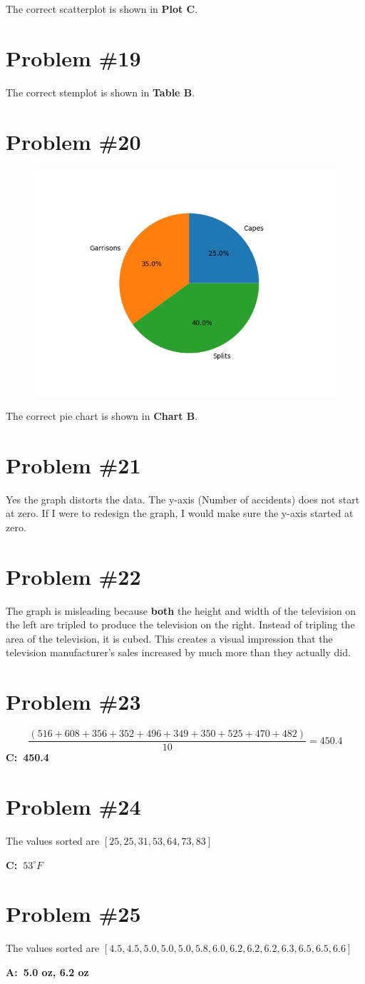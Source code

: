 \documentclass[12pt,fleqn]{article}
\newcommand{\problem}[1]{\vspace{5ex}\section*{Problem \##1}}
\begin{document}
The correct scatterplot is shown in \textbf{Plot C}.

\problem{19}
The correct stemplot is shown in \textbf{Table B}.


\pagebreak
\problem{20}
\begin{figure}[ht]
  \centering
  \includegraphics[width=12cm]{assets/houses.png}
\end{figure}

The correct pie chart is shown in \textbf{Chart B}.


\problem{21}
Yes the graph distorts the data. The y-axis (Number of accidents) does not start at zero. If I were to redesign the graph, I would make sure the y-axis started at zero.


\problem{22}
The graph is misleading because \textbf{both} the height and width of the television on the left are tripled to produce the television on the right. Instead of tripling the area of the television, it is cubed. This creates a visual impression that the television manufacturer's sales increased by much more than they actually did.


\problem{23}
\begin{equation*}
  \frac{(516 + 608 + 356 + 352 + 496 + 349 + 350 + 525 + 470 + 482)}{10} = 450.4
\end{equation*}
\textbf{C:\ 450.4}


\problem{24}
The values sorted are $[25, 25, 31, 53, 64, 73, 83]$

\textbf{C:\ $53^\circ F$}


\problem{25}
The values sorted are $[4.5, 4.5, 5.0, 5.0, 5.0, 5.8, 6.0, 6.2, 6.2, 6.2, 6.3, 6.5, 6.5, 6.6]$

\textbf{A:\ 5.0 oz, 6.2 oz}
\end{document}
